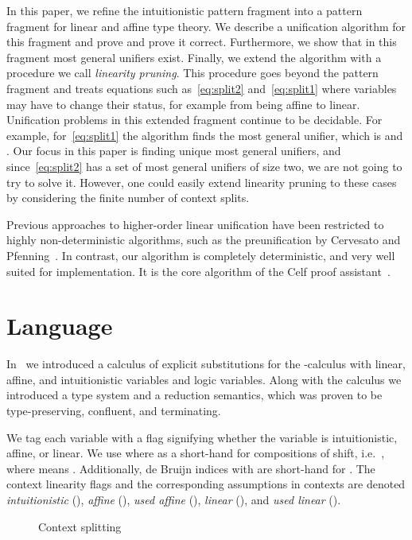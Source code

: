 \documentclass{eptcs}
\theoremstyle{definition}
\begin{document}
In this paper, we refine the intuitionistic pattern fragment into a
pattern fragment for linear and affine type theory.
We describe a unification algorithm for this fragment 
and prove and prove it correct. Furthermore, we show that in this fragment most general unifiers
exist. Finally, we extend the algorithm with a procedure we call
\emph{linearity pruning}.  This procedure goes beyond the pattern
fragment and treats equations such as~\eqref{eq:split2}
and~\eqref{eq:split1} where variables may have to change their status,
for example from being affine to linear.  Unification problems in this
extended fragment continue to be decidable.  For example,
for~\eqref{eq:split1} the algorithm finds the most general unifier, which is  and .
Our focus in this paper is finding unique most general unifiers, and
since~\eqref{eq:split2} has a set of most general unifiers of size two,
we are not going to try to solve it.  However, one could easily extend
linearity pruning to these cases by considering the finite number of context
splits.

Previous approaches to higher-order linear unification have been
restricted to highly non-deterministic algorithms, such as the
preunification by Cervesato and
Pfenning~\cite{Cervesato97linearhigher-order}.  In contrast, our
algorithm is completely deterministic, and very well suited for
implementation.  It is the core algorithm of the Celf proof
assistant~\cite{SchackNielsen08ijcar}.



\section{Language}
In~\cite{SchackNielsen10ijcar} we introduced a calculus of explicit substitutions
for the -calculus with linear, affine, and intuitionistic
variables and logic variables.  Along with the calculus we introduced a
type system and a reduction semantics, which was proven to be
type-preserving, confluent, and terminating.

We tag each variable  with a flag signifying whether
the variable is intuitionistic, affine, or linear.
We 
use  where  as a short-hand for  compositions of shift,
i.e.\ ,
where  means .  Additionally, de Bruijn indices
 with  are short-hand for .
The context linearity flags and the corresponding assumptions in
contexts are denoted \emph{intuitionistic} (),
\emph{affine} (), \emph{used affine} (),
\emph{linear} (), and \emph{used linear} ().

\begin{figure}[t]



\caption{Context splitting\label{fig:ctx-join}}
\end{figure} 
\end{document}

